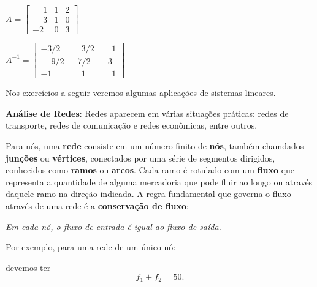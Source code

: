 \documentclass[12pt]{exam}
\begin{document}
\begin{exercicio}\label{matrizinversafim}
  $
    A =\begin{bmatrix}
        \phantom{-} 1 & 1 & 2\\
        \phantom{-} 3 & 1 & 0\\
        -2 & 0 & 3
    \end{bmatrix}
  $
  \begin{solucao}
    $
      A^{-1} =\begin{bmatrix}
        -3/2 & \phantom{-} 3/2 & \phantom{-} 1\\
        \phantom{-} 9/2 & -7/2 & -3\\
        -1 & \phantom{-} 1 & \phantom{-} 1
      \end{bmatrix}
    $
  \end{solucao}
\end{exercicio}


\vspace{2cm}

Nos exercícios a seguir veremos algumas aplicações de sistemas lineares.

\noindent\textbf{Análise de Redes}: Redes aparecem em várias situações práticas: redes de transporte, redes de comunicação e redes econômicas, entre outros.

Para nós, uma \textbf{rede} consiste em um número finito de \textbf{nós}, também chamdados \textbf{junções} ou \textbf{vértices}, conectados por uma série de segmentos
dirigidos, conhecidos como \textbf{ramos} ou \textbf{arcos}. Cada ramo é rotulado com um \textbf{fluxo} que representa a quantidade de alguma mercadoria que pode fluir ao longo ou através daquele ramo na direção indicada. A regra fundamental que governa o fluxo através de uma rede é a \textbf{conservação de fluxo}:
\begin{center}
  \textit{Em cada nó, o fluxo de entrada é igual ao fluxo de saída.}
\end{center}
Por exemplo, para uma rede de um único nó:
\begin{figure}[!h]
\centering

\end{figure}
devemos ter
\[
	f_1 + f_2 = 50.
\]
\end{document}

